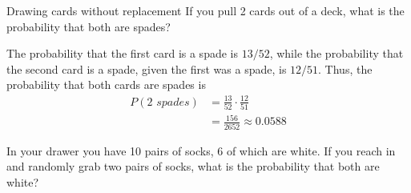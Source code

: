 \begin{example}[https://www.youtube.com/watch?v=6CvJ2GJ6HHU]{Drawing cards without replacement}
If you pull 2 cards out of a deck, what is the probability that both are spades? 

\sol
The probability that the first card is a spade is $13/52$, while the probability that the second card is a spade, given the first was a spade, is $12/51$. Thus, the probability that both cards are spades is
\begin{align*}
P(\mbox{2 } spades) &= \frac{13}{52} \cdot \frac{12}{51}\\
&= \boxed{\frac{156}{2652} \approx 0.0588}
\end{align*}
\end{example}

\begin{try}
In your drawer you have 10 pairs of socks, 6 of which are white. If you reach in and
randomly grab two pairs of socks, what is the probability that both are white?
\end{try}

